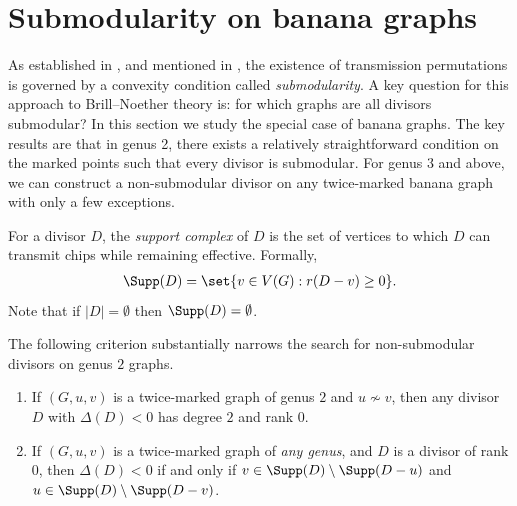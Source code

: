 \section{Submodularity on banana graphs}
\label{sec:submodularity}

As established in \cite{Pfl22}, and mentioned in , the existence of transmission permutations is governed by a convexity condition called \textit{submodularity}. A key question for this approach to Brill--Noether theory is: for which graphs are all divisors submodular? In this section we study the special case of banana graphs. The key results are that in genus 2, there exists a relatively straightforward condition on the marked points such that every divisor is submodular. For genus $3$ and above, we can construct a non-submodular divisor on any twice-marked banana graph with only a few exceptions.

\begin{defi}\label{def-Supp}
For a divisor $D$, the \textit{support complex} of $D$ is the set of vertices to which $D$ can transmit chips while remaining effective. Formally,
\begin{align*}
    \Supp(D) = \set{v \in V(G):r(D-v)\geq 0}.
\end{align*}
Note that if $|D| = \emptyset$ then $\Supp(D) = \emptyset$.
\end{defi}

The following criterion substantially narrows the search for non-submodular divisors on genus $2$ graphs.

\begin{lemma}\label{lemm-rank0supp}
\begin{enumerate}[label = \arabic*)]
\item
    If $(G,u,v)$ is a twice-marked graph of genus $2$ and $u \not\sim v$, then any divisor $D$ with $\Delta(D)<0$ has degree $2$ and rank $0$. 
\item 
If $(G,u,v)$ is a twice-marked graph of \emph{any genus}, and $D$ is a divisor of rank $0$, then $\Delta(D)<0$ if and only if $v \in \Supp(D)\setminus \Supp(D-u)$ and $u \in \Supp(D) \setminus \Supp(D-v)$.
\end{enumerate}
\end{lemma}

